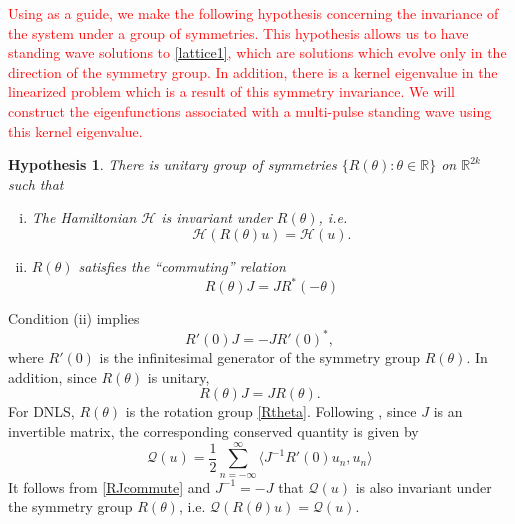 \documentclass[12pt]{elsarticle}
\def\R{{\mathbb R}}
\newtheorem{hypothesis}{Hypothesis}
\newcommand{\revised}[1]{ \textcolor{red}{#1} }
\begin{document}
\revised{Using \cite{Grillakis1987} as a guide, we make the following hypothesis concerning the invariance of the system under a group of symmetries. This hypothesis allows us to have standing wave solutions to \eqref{lattice1}, which are solutions which evolve only in the direction of the symmetry group. In addition, there is a kernel eigenvalue in the linearized problem which is a result of this symmetry invariance. We will construct the eigenfunctions associated with a multi-pulse standing wave using this kernel eigenvalue.}
\begin{hypothesis}\label{symmetryhyp}
There is unitary group of symmetries $\{ R(\theta) : \theta \in \R \}$ on $\R^{2k}$ such that 
\begin{enumerate}[(i)]
\item The Hamiltonian $\mathcal{H}$ is invariant under $R(\theta)$, i.e. 
\begin{equation}\label{Hinvariance}
\mathcal{H}(R(\theta)u) = \mathcal{H}(u).
\end{equation}
\item $R(\theta)$ satisfies the ``commuting'' relation
\begin{equation}\label{RJcommute}
R(\theta) J = J R^*(-\theta)
\end{equation}
\end{enumerate}
\end{hypothesis}
\noindent Condition (ii) implies 
\begin{equation}\label{RprimeJcommute}
R'(0) J = -J R'(0)^*,
\end{equation}
where $R'(0)$ is the infinitesimal generator of the symmetry group $R(\theta)$. In addition, since $R(\theta)$ is unitary,
\begin{equation}\label{RJcommute2}
R(\theta) J = J R(\theta).
\end{equation}
For DNLS, $R(\theta)$ is the rotation group \cref{Rtheta}. Following \cite[(2.9)]{Grillakis1987}, since $J$ is an invertible matrix, the corresponding conserved quantity is given by
\begin{equation}\label{genQ}
\mathcal{Q}(u) = \frac{1}{2} \sum_{n = -\infty}^\infty 
\langle J^{-1}R'(0) u_n, u_n \rangle
\end{equation}
It follows from \eqref{RJcommute} and $J^{-1} = -J$ that $\mathcal{Q}(u)$ is also invariant under the symmetry group $R(\theta)$, i.e. $\mathcal{Q}(R(\theta)u) = \mathcal{Q}(u)$.
\end{document}
